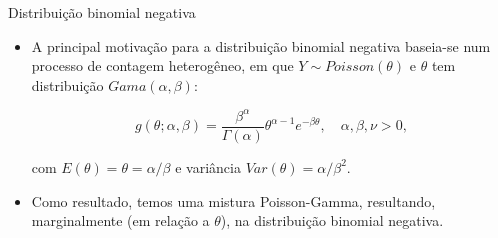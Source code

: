\documentclass[10pt, aspectratio=169]{beamer}
\begin{document}
\begin{frame}{Distribuição binomial negativa} 

\begin{itemize}

\item A principal motivação para a distribuição binomial negativa baseia-se num processo de contagem heterogêneo, em que $Y \sim Poisson( \theta)$ e $\theta$ tem distribuição $Gama(\alpha, \beta):$

$$
g\left ( \theta;\alpha,\beta \right )=\frac{\beta^{\alpha}}{\Gamma\left ( \alpha \right )}\theta^{\alpha-1}e^{-\beta \theta},\quad \alpha, \beta, \nu>0,
$$

com $E(\theta)=\theta=\alpha /\beta$ e variância $Var(\theta)=\alpha /\beta^2.$

\vspace{0.5cm}

\item Como resultado, temos uma mistura Poisson-Gamma, resultando, marginalmente (em relação a $\theta$), na distribuição binomial negativa.


\end{itemize}

\end{frame}





\end{document}
